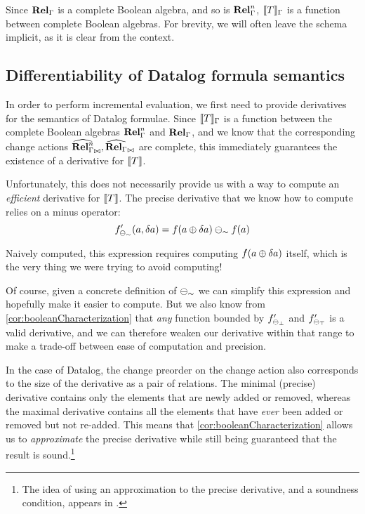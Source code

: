 Since $\mathbf{Rel}_\Gamma$ is a complete Boolean algebra, and so is $\mathbf{Rel}_\Gamma^n$, $\llbracket T \rrbracket_\Gamma$ is
a function between complete Boolean algebras. For brevity, we will often leave the schema implicit,
as it is clear from the context.

\subsection{Differentiability of Datalog formula semantics}
\label{sec:datalogDifferentiability}

In order to perform incremental evaluation, we first need to provide derivatives for the semantics
of Datalog formulae. Since $\llbracket T \rrbracket_\Gamma$ is a function between the complete Boolean algebras 
$\mathbf{Rel}_\Gamma^n$ and
$\mathbf{Rel}_\Gamma$, and we know that the corresponding change actions 
$\widehat{\mathbf{Rel}_\Gamma^n}_{\bowtie}, \widehat{\mathbf{Rel}_\Gamma}_{\bowtie}$
are complete, this immediately guarantees the existence of a derivative for $\llbracket T \rrbracket$.

Unfortunately, this does not necessarily provide us with a way to compute an \emph{efficient} 
derivative for $\llbracket T \rrbracket$. The precise derivative that we know how to compute relies on
a minus operator:
\begin{displaymath}
  f'_{\ominus_\sim}(a, \delta a) = f(a \oplus \delta a) \ominus_\sim f(a)
\end{displaymath}

Naively computed, this expression requires computing $f(a \oplus \delta a)$
itself, which is the very thing we were trying to avoid computing!

Of course, given a concrete definition of $\ominus_\sim$ we can simplify this
expression and hopefully make it easier to compute. But we also know from
\cref{cor:booleanCharacterization} that \emph{any} function bounded by
$f'_{\ominus_\bot}$ and $f'_{\ominus_\top}$ is a valid derivative,
and we can therefore weaken our derivative within that range to make a 
trade-off between ease of computation and precision.

In the case of Datalog, the change preorder on the change action also
corresponds to the size of the derivative as a pair of relations. The minimal (precise)
derivative contains only the elements that are newly added or removed,
whereas the maximal derivative contains all the elements that have \emph{ever}
been added or removed but not re-added. This means that \cref{cor:booleanCharacterization} allows
us to \emph{approximate} the precise derivative while still being
guaranteed that the result is sound.\footnote{The idea of using an approximation
to the precise derivative, and a soundness condition, appears in \textcite{bancilhon1986amateur}.}

